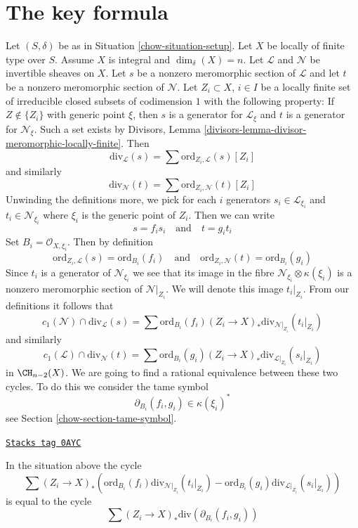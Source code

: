 \section{The key formula}
\label{chow-section-key}
Let $(S, \delta)$ be as in Situation \ref{chow-situation-setup}.
Let $X$ be locally of finite type over $S$. Assume
$X$ is integral and $\dim_\delta(X) = n$.
Let $\mathcal{L}$ and $\mathcal{N}$ be invertible sheaves on $X$.
Let $s$ be a nonzero meromorphic section of $\mathcal{L}$ and
let $t$ be a nonzero meromorphic section of $\mathcal{N}$.
Let $Z_i \subset X$, $i \in I$ be a locally finite set of irreducible
closed subsets of codimension $1$ with the following property:
If $Z \not \in \{Z_i\}$ with generic point $\xi$, then $s$ is a generator
for $\mathcal{L}_\xi$ and $t$ is a generator for $\mathcal{N}_\xi$.
Such a set exists by
Divisors, Lemma \ref{divisors-lemma-divisor-meromorphic-locally-finite}.
Then
$$
\text{div}_\mathcal{L}(s) = \sum \text{ord}_{Z_i, \mathcal{L}}(s) [Z_i]
$$
and similarly
$$
\text{div}_\mathcal{N}(t) = \sum \text{ord}_{Z_i, \mathcal{N}}(t) [Z_i]
$$
Unwinding the definitions more, we pick for each $i$ generators
$s_i \in \mathcal{L}_{\xi_i}$ and $t_i \in \mathcal{N}_{\xi_i}$
where $\xi_i$ is the generic point of $Z_i$. Then we can write
$$
s = f_i s_i
\quad\text{and}\quad
t = g_i t_i
$$
Set $B_i = \mathcal{O}_{X, \xi_i}$. Then by definition
$$
\text{ord}_{Z_i, \mathcal{L}}(s) = \text{ord}_{B_i}(f_i)
\quad\text{and}\quad
\text{ord}_{Z_i, \mathcal{N}}(t) = \text{ord}_{B_i}(g_i)
$$
Since $t_i$ is a generator of $\mathcal{N}_{\xi_i}$ we see that
its image in the fibre $\mathcal{N}_{\xi_i} \otimes \kappa(\xi_i)$
is a nonzero meromorphic section of $\mathcal{N}|_{Z_i}$. We will denote
this image $t_i|_{Z_i}$. From our definitions it follows that
$$
c_1(\mathcal{N}) \cap \text{div}_\mathcal{L}(s) =
\sum \text{ord}_{B_i}(f_i)
(Z_i \to X)_*\text{div}_{\mathcal{N}|_{Z_i}}(t_i|_{Z_i})
$$
and similarly
$$
c_1(\mathcal{L}) \cap \text{div}_\mathcal{N}(t) =
\sum \text{ord}_{B_i}(g_i)
(Z_i \to X)_*\text{div}_{\mathcal{L}|_{Z_i}}(s_i|_{Z_i})
$$
in $\CH_{n - 2}(X)$. We are going to find a rational equivalence between
these two cycles. To do this we consider the tame symbol
$$
\partial_{B_i}(f_i, g_i) \in \kappa(\xi_i)^*
$$
see Section \ref{chow-section-tame-symbol}.

\begin{lemma}

\label{chow-lemma-key-formula}
\href{https://stacks.math.columbia.edu/tag/0AYC}{\texttt{Stacks tag 0AYC}}

In the situation above the cycle
$$
\sum
(Z_i \to X)_*\left(
\text{ord}_{B_i}(f_i) \text{div}_{\mathcal{N}|_{Z_i}}(t_i|_{Z_i}) -
\text{ord}_{B_i}(g_i) \text{div}_{\mathcal{L}|_{Z_i}}(s_i|_{Z_i}) \right)
$$
is equal to the cycle
$$
\sum (Z_i \to X)_*\text{div}(\partial_{B_i}(f_i, g_i))
$$
\end{lemma}

